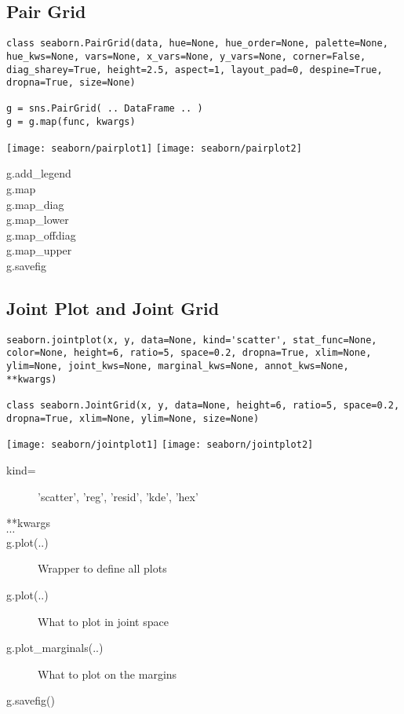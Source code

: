 \subsection{Pair Grid}
\begin{verbatim}
class seaborn.PairGrid(data, hue=None, hue_order=None, palette=None, 
hue_kws=None, vars=None, x_vars=None, y_vars=None, corner=False, 
diag_sharey=True, height=2.5, aspect=1, layout_pad=0, despine=True, 
dropna=True, size=None)

g = sns.PairGrid( .. DataFrame .. )
g = g.map(func, kwargs)
\end{verbatim}
\texttt{[image: seaborn/pairplot1]}
\texttt{[image: seaborn/pairplot2]}
\begin{description}
	\item[g.add\_legend] 
	\item[g.map] 
	\item[g.map\_diag]
	\item[g.map\_lower] 
	\item[g.map\_offdiag] 
	\item[g.map\_upper]
	\item[g.savefig]   
\end{description}

\subsection{Joint Plot and Joint Grid}
\begin{verbatim}
seaborn.jointplot(x, y, data=None, kind='scatter', stat_func=None, 
color=None, height=6, ratio=5, space=0.2, dropna=True, xlim=None, 
ylim=None, joint_kws=None, marginal_kws=None, annot_kws=None, **kwargs)

class seaborn.JointGrid(x, y, data=None, height=6, ratio=5, space=0.2, 
dropna=True, xlim=None, ylim=None, size=None)
\end{verbatim}
\texttt{[image: seaborn/jointplot1]}
\texttt{[image: seaborn/jointplot2]}
\begin{description}
	\item[kind=] 'scatter', 'reg', 'resid', 'kde', 'hex' 	
	\item[**kwargs] 
	\item[ $\cdots$ ] 
	\item[g.plot(..)] Wrapper to define all plots
	\item[g.plot(..)] What to plot in joint space
	\item[g.plot\_marginals(..)] What to plot on the margins
	\item[g.savefig()] 
\end{description}

